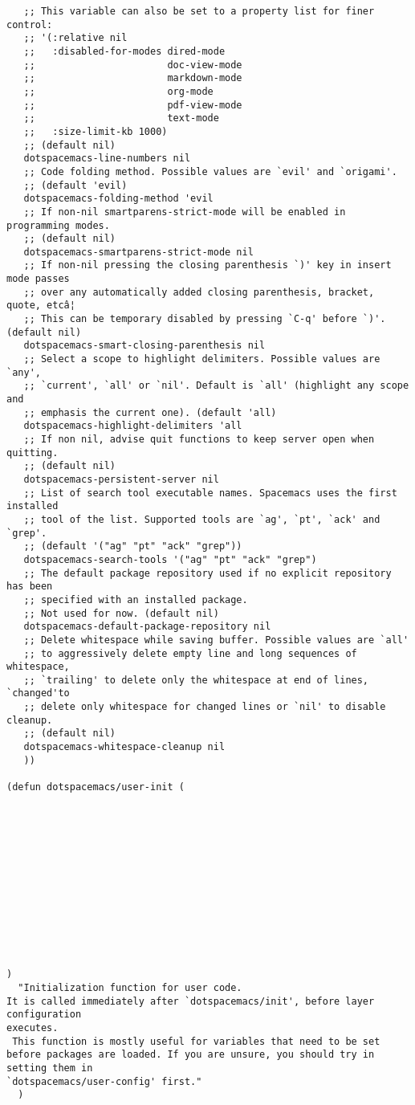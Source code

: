 \documentclass[11pt]{article}
\begin{document}
\begin{verbatim}
   ;; This variable can also be set to a property list for finer control:
   ;; '(:relative nil
   ;;   :disabled-for-modes dired-mode
   ;;                       doc-view-mode
   ;;                       markdown-mode
   ;;                       org-mode
   ;;                       pdf-view-mode
   ;;                       text-mode
   ;;   :size-limit-kb 1000)
   ;; (default nil)
   dotspacemacs-line-numbers nil
   ;; Code folding method. Possible values are `evil' and `origami'.
   ;; (default 'evil)
   dotspacemacs-folding-method 'evil
   ;; If non-nil smartparens-strict-mode will be enabled in programming modes.
   ;; (default nil)
   dotspacemacs-smartparens-strict-mode nil
   ;; If non-nil pressing the closing parenthesis `)' key in insert mode passes
   ;; over any automatically added closing parenthesis, bracket, quote, etcâ¦
   ;; This can be temporary disabled by pressing `C-q' before `)'. (default nil)
   dotspacemacs-smart-closing-parenthesis nil
   ;; Select a scope to highlight delimiters. Possible values are `any',
   ;; `current', `all' or `nil'. Default is `all' (highlight any scope and
   ;; emphasis the current one). (default 'all)
   dotspacemacs-highlight-delimiters 'all
   ;; If non nil, advise quit functions to keep server open when quitting.
   ;; (default nil)
   dotspacemacs-persistent-server nil
   ;; List of search tool executable names. Spacemacs uses the first installed
   ;; tool of the list. Supported tools are `ag', `pt', `ack' and `grep'.
   ;; (default '("ag" "pt" "ack" "grep"))
   dotspacemacs-search-tools '("ag" "pt" "ack" "grep")
   ;; The default package repository used if no explicit repository has been
   ;; specified with an installed package.
   ;; Not used for now. (default nil)
   dotspacemacs-default-package-repository nil
   ;; Delete whitespace while saving buffer. Possible values are `all'
   ;; to aggressively delete empty line and long sequences of whitespace,
   ;; `trailing' to delete only the whitespace at end of lines, `changed'to
   ;; delete only whitespace for changed lines or `nil' to disable cleanup.
   ;; (default nil)
   dotspacemacs-whitespace-cleanup nil
   ))

(defun dotspacemacs/user-init (













)
  "Initialization function for user code.
It is called immediately after `dotspacemacs/init', before layer configuration
executes.
 This function is mostly useful for variables that need to be set
before packages are loaded. If you are unsure, you should try in setting them in
`dotspacemacs/user-config' first."
  )


\end{verbatim}
\end{document}
